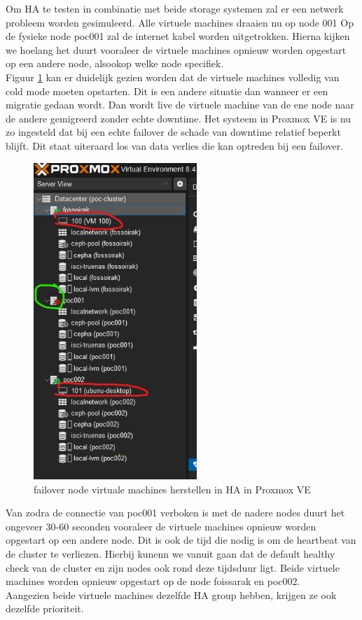 Om HA te testen in combinatie met beide storage systemen zal er een netwerk probleem worden gesimuleerd.
Alle virtuele machines draaien nu op node 001
Op de fysieke node poc001 zal de internet kabel worden uitgetrokken. Hierna kijken we hoelang het duurt vooraleer de virtuele machines opnieuw worden opgestart op een andere node, alsookop welke node specifiek. \\

Figuur \ref{fig:failover-vm} kan er duidelijk gezien worden dat de virtuele machines volledig van cold mode moeten opstarten. Dit is een andere situatie dan wanneer er een migratie gedaan wordt.
Dan wordt live de virtuele machine van de ene node naar de andere gemigreerd zonder echte downtime.
Het systeem in Proxmox VE is nu zo ingesteld dat bij een echte failover de schade van downtime relatief beperkt blijft. Dit staat uiteraard los van data verlies die kan optreden bij een failover.
\begin{figure}[H]
  \centering
  \includegraphics[width=0.55\textwidth]{../poc/failover-prox.png}
  \caption{failover node virtuale machines herstellen in HA in Proxmox VE}
  \label{fig:failover-vm}
\end{figure}

Van zodra de connectie van poc001 verboken is met de nadere nodes duurt het ongeveer 30-60 seconden vooraleer de virtuele machines opnieuw worden opgestart op een andere node. Dit is ook de tijd die nodig is om de heartbeat van de cluster te verliezen.
Hierbij kunenn we vanuit gaan dat de default healthy check van de cluster en zijn nodes ook rond deze tijdsduur ligt. Beide virtuele machines worden opnieuw opgestart op de node foissarak en poc002. \\
Aangezien beide virtuele machines dezelfde HA group hebben, krijgen ze ook dezelfde prioriteit.

